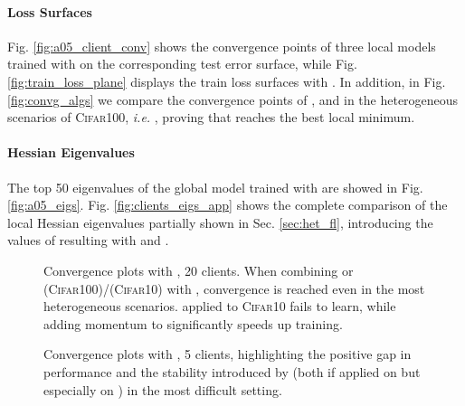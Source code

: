 \paragraph{Loss Surfaces} Fig. \ref{fig:a05_client_conv} shows the convergence points of three local models trained with  on the corresponding test error surface, while Fig. \ref{fig:train_loss_plane} displays the train loss surfaces with . In addition, in Fig. \ref{fig:convg_algs} we compare the convergence points of \fedavg, \fedsam and \fedasam in the heterogeneous scenarios of \textsc{Cifar100}, \textit{i.e.} , proving that \asam reaches the best local minimum. 
\paragraph{Hessian Eigenvalues} The top 50 eigenvalues of the global model trained with  are showed in Fig. \ref{fig:a05_eigs}. Fig. \ref{fig:clients_eigs_app} shows the complete comparison of the local Hessian eigenvalues partially shown in Sec. \ref{sec:het_fl}, introducing the values of  resulting with \sam and . 

\captionsetup[subfloat]{font=scriptsize,labelformat=empty}
\begin{figure}
    \centering
    \caption{Convergence plots with , 20 clients. When combining \fedavgm or \fedsam (\textsc{Cifar100})/\fedasam (\textsc{Cifar10}) with \swa, convergence is reached even in the most heterogeneous scenarios. \fedavgmswa applied to \textsc{Cifar10} fails to learn, while adding momentum to \fedasam significantly speeds up training.}
    \label{fig:convergence}
\end{figure}

\begin{figure}
    \centering
    \caption{Convergence plots with , 5 clients, highlighting the positive gap in performance and the stability introduced by \swa (both if applied on \fedavg but especially on \fedasam) in the most difficult setting.}
    \label{fig:conv_k5}
\end{figure}

